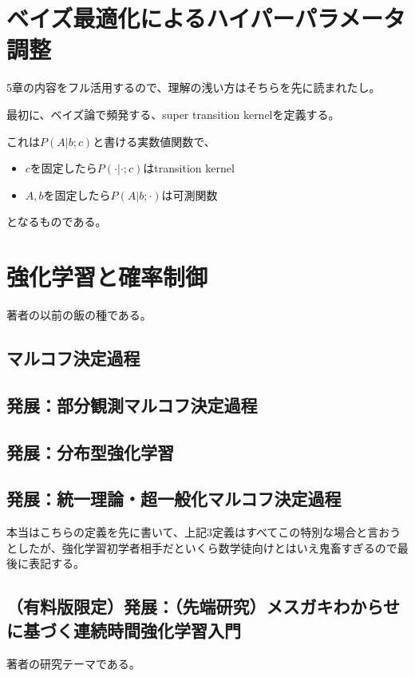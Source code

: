 \documentclass{jsarticle}
\begin{document}
\section{ベイズ最適化によるハイパーパラメータ調整}

5章の内容をフル活用するので、理解の浅い方はそちらを先に読まれたし。

最初に、ベイズ論で頻発する、super transition kernelを定義する。

これは$P(A|b;c)$と書ける実数値関数で、

\begin{itemize}
\item $c$を固定したら$P(\cdot|\cdot;c)$はtransition kernel
\item $A,b$を固定したら$P(A|b;\cdot)$は可測関数
\end{itemize}

となるものである。




\newpage

\section{強化学習と確率制御}
著者の以前の飯の種である。
\subsection{マルコフ決定過程}



\subsection{発展：部分観測マルコフ決定過程}




\subsection{発展：分布型強化学習}


\subsection{発展：統一理論・超一般化マルコフ決定過程}
本当はこちらの定義を先に書いて、上記3定義はすべてこの特別な場合と言おうとしたが、強化学習初学者相手だといくら数学徒向けとはいえ鬼畜すぎるので最後に表記する。


\subsection{（有料版限定）発展：（先端研究）メスガキわからせに基づく連続時間強化学習入門}
著者の研究テーマである。
\end{document}
